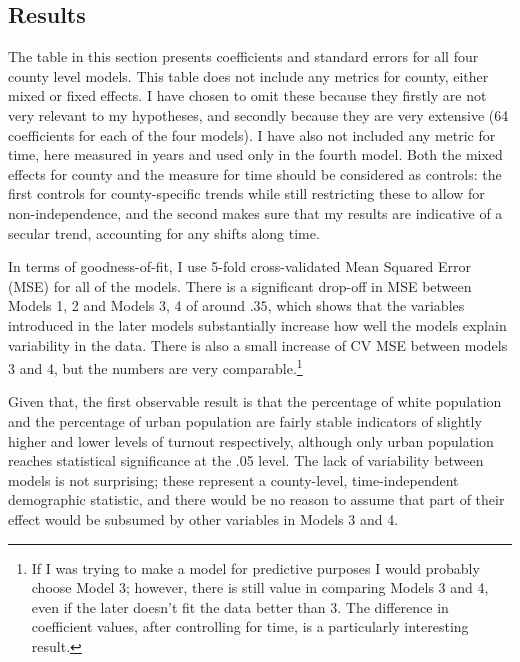 \documentclass[12pt,twoside]{reedthesis}
\begin{document}
  \subsection{Results}\label{results}
  
  The table in this section presents coefficients and standard errors for
  all four county level models. This table does not include any metrics
  for county, either mixed or fixed effects. I have chosen to omit these
  because they firstly are not very relevant to my hypotheses, and
  secondly because they are very extensive (64 coefficients for each of
  the four models). I have also not included any metric for time, here
  measured in years and used only in the fourth model. Both the mixed
  effects for county and the measure for time should be considered as
  controls: the first controls for county-specific trends while still
  restricting these to allow for non-independence, and the second makes
  sure that my results are indicative of a secular trend, accounting for
  any shifts along time.
  
  In terms of goodness-of-fit, I use 5-fold cross-validated Mean Squared
  Error (MSE) for all of the models. There is a significant drop-off in
  MSE between Models 1, 2 and Models 3, 4 of around \(.35\), which shows
  that the variables introduced in the later models substantially increase
  how well the models explain variability in the data. There is also a
  small increase of CV MSE between models 3 and 4, but the numbers are
  very comparable.\footnote{If I was trying to make a model for predictive
    purposes I would probably choose Model 3; however, there is still
    value in comparing Models 3 and 4, even if the later doesn't fit the
    data better than 3. The difference in coefficient values, after
    controlling for time, is a particularly interesting result.}
  
  Given that, the first observable result is that the percentage of white
  population and the percentage of urban population are fairly stable
  indicators of slightly higher and lower levels of turnout respectively,
  although only urban population reaches statistical significance at the
  .05 level. The lack of variability between models is not surprising;
  these represent a county-level, time-independent demographic statistic,
  and there would be no reason to assume that part of their effect would
  be subsumed by other variables in Models 3 and 4.
  
\end{document}
